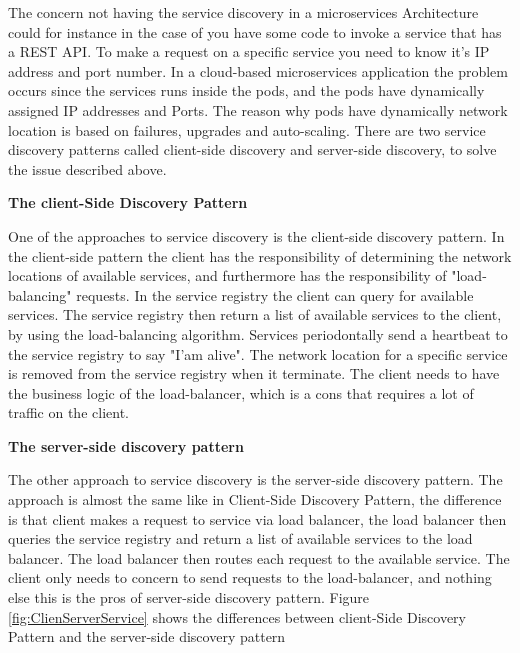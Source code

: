 The concern not having the service discovery in a microservices Architecture could for instance in the case of you have some code to invoke a service that has a REST API. To make a request on a specific service you need to know it's IP address and port number. In a cloud-based microservices application the problem occurs since the services runs inside the pods, and the pods have dynamically assigned IP addresses and Ports. The reason why pods have dynamically network location is based on failures, upgrades and auto-scaling. There are two service discovery patterns called client-side discovery and server-side discovery, to solve the issue described above.         

\textbf{The client-Side Discovery Pattern}

One of the approaches to service discovery is the client-side discovery pattern. In the client-side pattern the client has the responsibility of determining the network locations of available services, and furthermore has the responsibility of "load-balancing" requests. In the service registry the client can query for available services. The service registry then return a list of available services to the client, by using the load-balancing algorithm. Services periodontally send a heartbeat to the service registry to say "I'am alive". The network location for a specific service is removed from the service registry when it terminate. The client needs to have the business logic of the load-balancer, which is a cons that requires a lot of traffic on the client.\cite{ServiceDis}

\textbf{The server-side discovery pattern}

The other approach to service discovery is the server-side discovery pattern. The approach is almost the same like in Client-Side Discovery Pattern, the difference is that client makes a request to service via load balancer, the load balancer then queries the service registry and return a list of available services to the load balancer. The load balancer then routes each request to the available service. The client only needs to concern to send requests to the load-balancer, and nothing else this is the pros of server-side discovery pattern.\cite{ServiceDis}
Figure \ref{fig:ClienServerService} shows the differences between client-Side Discovery Pattern and the server-side discovery pattern  



